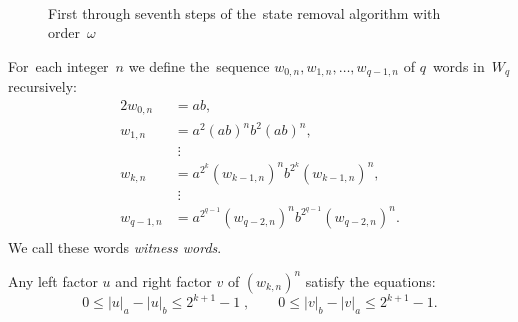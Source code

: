 \begin{figure}%
    \centering
    \subfloat[][]{%
        \label{fig:automaton_R8_state_removal_steps-a}%
        }%
    \hspace{70pt}%
    \subfloat[][]{%
        \label{fig:automaton_R8_state_removal_steps-b}%
        }\\
    \subfloat[][]{%
        \label{fig:automaton_R8_state_removal_steps-c}%
        }%
    \hspace{8pt}%
    \subfloat[][]{%
        \label{fig:automaton_R8_state_removal_steps-d}%
        }\\
    \subfloat[][]{%
        \label{fig:automaton_R8_state_removal_steps-e}%
        }\\
    \subfloat[][]{%
        \label{fig:automaton_R8_state_removal_steps-e}%
        }%
    \hspace{20pt}%
    \subfloat[][]{%
        \label{fig:automaton_R8_state_removal_steps-e}%
        }%
    \caption{First through seventh steps of the~state removal algorithm with order~$\omega$}%
    \label{fig:automaton_R8_state_removal_steps}%
\end{figure}

\begin{defn}
    For~each integer~$n$ we define the~sequence $w_{0,n}, w_{1,n}, \dotsc , w_{q-1,n}$ of $q$~words in~$W_q$ recursively:
    \begin{alignat*}{2}
        w_{0,n} &= ab,\\
        w_{1,n} &= a^2{(ab)}^{n}b^2{(ab)}^{n},\\
                &\; \vdots \\
        w_{k,n} &= a^{2^k}{(w_{k-1,n})}^{n}b^{2^k}{(w_{k-1,n})}^{n},\\
                &\; \vdots \\
        w_{q-1,n} &= a^{2^{q-1}}{(w_{q-2,n})}^{n}b^{2^{q-1}}{(w_{q-2,n})}^{n}.\\
    \end{alignat*}
    We call these words \emph{witness words}.
\end{defn}

\begin{lemma}
    Any left factor $u$ and right factor $v$ of ${(w_{k,n})}^n$ satisfy the equations:
    \begin{equation}\label{witness_words_inequalities}
        0 \leq |u|_a - |u|_b \leq 2^{k+1}-1 \; , \qquad 0 \leq |v|_b - |v|_a \leq 2^{k+1}-1.
    \end{equation}
\end{lemma}

